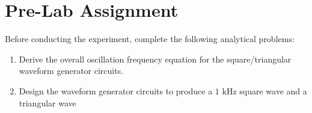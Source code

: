 \section{Pre-Lab Assignment}
Before conducting the experiment, complete the following analytical problems:
\begin{enumerate}
	\item Derive the overall oscillation frequency equation for the square/triangular waveform generator circuits.
	\item Design the waveform generator circuits to produce a $1\text{ kHz}$ square wave and a triangular wave %
\end{enumerate}

%

